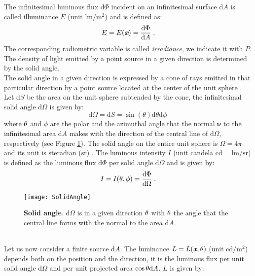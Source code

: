 The infinitesimal luminous flux $\textrm{d}\Phi$ incident on an infinitesimal surface $\textrm{d}A$ is called illuminance $E$ (unit $\textrm{lm}/\textrm{m}^2$)
and is defined as:
\begin{equation}
 E=E(\textit{\textbf{x}}) = \frac{\textrm{d}\Phi}{\textrm{d}A}\;,
 \end{equation}
The corresponding radiometric variable is called \textit{irradiance}, we indicate it with $P$. The density of light emitted by a point source in a given direction is determined by the solid angle.\\ \indent
The solid angle in a given direction is expressed by a cone of rays emitted in that particular direction by a point source located at the center of the unit sphere \cite{koshel2012illumination}. 
Let $\textrm{d}S$ be the area on the unit sphere subtended by the cone,
the infinitesimal solid angle $\textrm{d}\Omega$ is given by:
\begin{equation}\label{solid_angle}
\textrm{d}\Omega = \textrm{d}S= \sin(\theta)\textrm{d}\theta \textrm{d}\phi\,
\end{equation}
 where $\theta$ and $\phi$ are the polar and the azimuthal angle that the normal $\boldsymbol{\nu}$ to the infinitesimal area $\textrm{d}A$ makes with the direction of the central line of $\textrm{d}\Omega$, respectively (see Figure \ref{fig:rad}).
The solid angle on the entire unit sphere is $\Omega = 4\pi$ and its unit is steradian ($\textrm{sr}$) \cite{arecchi2007field}.
The luminous intensity $I$ (unit candela $\textrm{cd}=\textrm{lm}/\textrm{sr}$) is defined as the luminous flux $\textrm{d}\Phi$ per solid angle
$\textrm{d}\Omega$ and is given by:
\begin{equation}\label{intensity}
I = I(\theta, \phi) = \frac{\textrm{d}\Phi}{\textrm{d}\Omega}\;.
\end{equation}
 \begin{figure}[t]
  \begin{center}
  \texttt{[image: SolidAngle]}
  \end{center}
  \caption{\textbf{Solid angle}. $\textrm{d}\Omega$ is in a given direction $\theta$ with $\theta$ the angle that the central line forms with the normal to the area $\textrm{d}A$.}
  \label{fig:rad}
  \end{figure}
\\ \indent Let us now consider a finite source $\textrm{d}A$.
The luminance $L = L(\textit{\textbf{x}}, \theta)$ (unit $\textrm{cd} / \textrm{m}^2$) depends both on the position and the direction, it is the luminous flux per unit solid angle $\textrm{d}\Omega$ and  per unit projected area $\cos\theta \textrm{d}A$.  $L$  is given by:
